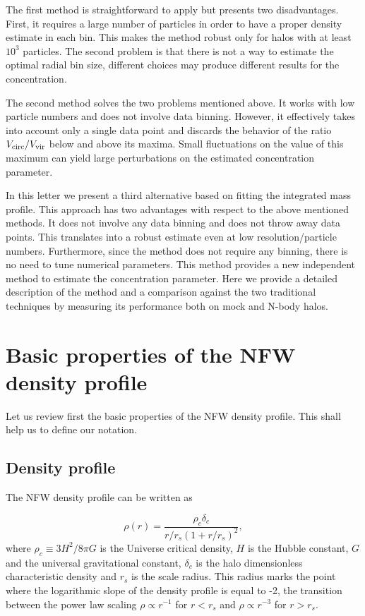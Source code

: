 \documentclass[a4,useAMS,usenatbib,usegraphicx]{mn2e}
\begin{document}
The first method is straightforward to apply but presents two
disadvantages.  
First, it requires a large number of particles in
order to have a proper density estimate in each bin.  
This makes the method robust only for halos with at least $10^3$ particles.  
The second problem is that there is not a way to estimate the optimal
radial bin size, different choices may produce different results for the
concentration.

The second method solves the two problems mentioned above.  
It works with low particle numbers and does not involve data binning.  
However, it effectively takes into account only a single data point and
discards the behavior of the ratio $V_{\rm circ}/V_{\rm vir}$ below
and above its maxima.  
Small fluctuations on the value of this maximum can yield large
perturbations on the estimated concentration parameter.  

In this letter we present a third alternative based on fitting the
integrated mass profile.
This approach has two advantages with respect to the above mentioned
methods.  
It does not involve any data binning and does not throw away data
points. 
This translates into a robust estimate even at low resolution/particle
numbers.   
Furthermore, since the method does not require any binning, there is
no need to tune numerical parameters.
This method provides a new independent method to estimate the
concentration parameter.   
Here we provide a detailed description of the method and a
comparison against the two traditional techniques by measuring its
performance both on mock and N-body halos.


\section{Basic properties of the NFW density profile}
\label{sec:basics}

Let us review first the basic properties of the NFW density profile.
This shall help us to define our notation.

\subsection{Density profile}

The NFW density profile can be written as

\begin{equation}
\rho(r) = \frac{\rho_c\delta_c}{r/r_s(1+r/r_s)^2},
\label{eq:definition}
\end{equation}
%
where $\rho_c\equiv 3H^2/8\pi G$ is the Universe critical density, $H$
is the Hubble constant, $G$ and the universal gravitational constant,
$\delta_c$ is the halo dimensionless characteristic density and $r_s$
is the scale radius. 
This radius marks the point where the logarithmic slope of the density
profile is equal to -2, the transition between the power law
scaling $\rho\propto r^{-1}$ for $r<r_s$ and $\rho\propto r^{-3}$ for
$r>r_s$. 
\end{document}
